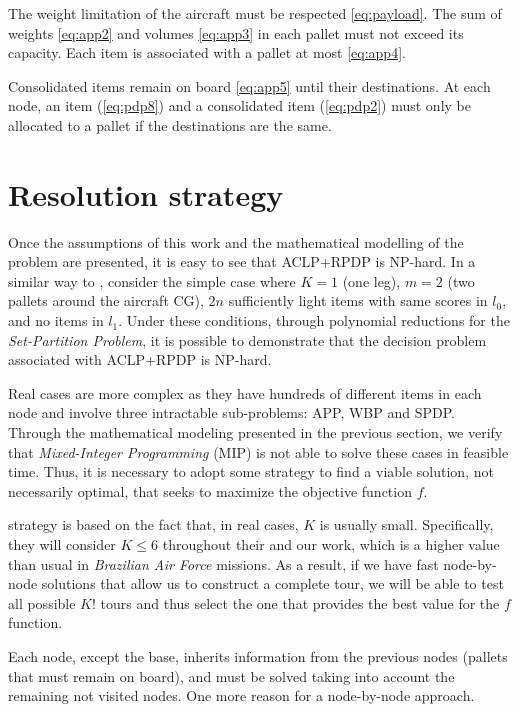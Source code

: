 \documentclass[preprint,authoryear]{elsarticle}
\begin{document}
The weight limitation of the aircraft must be respected \ref{eq:payload}. The sum of weights \ref{eq:app2} and volumes \ref{eq:app3} in each pallet must not exceed its capacity. Each item is associated with a pallet at most \ref{eq:app4}.

Consolidated items remain on board \ref{eq:app5} until their destinations. At each node, an item (\ref{eq:pdp8}) and a consolidated item (\ref{eq:pdp2}) must only be allocated to a pallet if the destinations are the same.


\section{Resolution strategy}
\label{sec5}

Once the assumptions of this work and the mathematical modelling of the problem are presented, it is easy to see that ACLP+RPDP is NP-hard. In a similar way to \cite[p. 6]{LurkinSchyns2015}, consider the simple case where $K=1$\/ (one leg), $m=2$ (two pallets around the aircraft CG), $2n$\/ sufficiently light items with same scores in $l_0$, and no items in $l_1$. Under these conditions, through polynomial reductions for the {\it Set-Partition Problem}, it is possible to demonstrate that the decision problem associated with ACLP+RPDP is NP-hard.

Real cases are more complex as they have hundreds of different items in each node and involve three intractable sub-problems: APP, WBP and SPDP. Through the mathematical modeling presented in the previous section, we verify that {\it Mixed-Integer Programming}\/ (MIP) is not able to solve these cases in feasible time. Thus, it is necessary to adopt some strategy to find a viable solution, not necessarily optimal, that seeks to maximize the objective function $f$.

\cite{MesquitaSanches2023} strategy is based on the fact that, in real cases, $K$\/ is usually small. Specifically, they will consider $K \leq 6$\/ throughout their and our work, which is a higher value than usual in {\it Brazilian Air Force} missions. As a result, if we have fast node-by-node solutions that allow us to construct a complete tour, we will be able to test all possible $K!$\/ tours and thus select the one that provides the best value for the $f$\/ function.

Each node, except the base, inherits information from the previous nodes (pallets that must remain on board), and must be solved taking into account the remaining not visited nodes. One more reason for a node-by-node approach.
\end{document}
